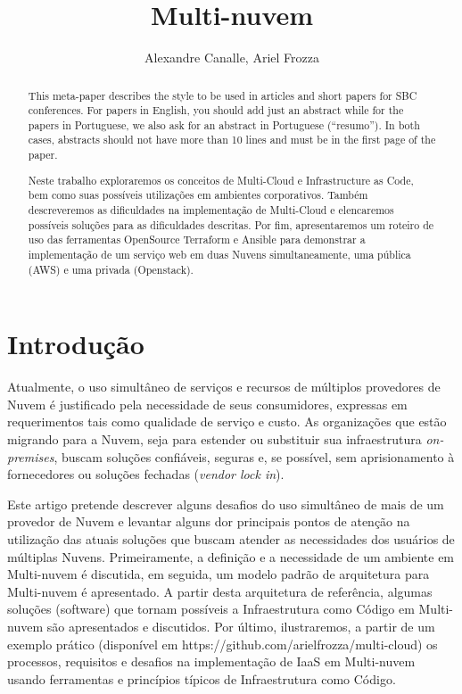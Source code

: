\documentclass[12pt]{article}
\title{Multi-nuvem}
\author{Alexandre Canalle\inst{1}, Ariel Frozza\inst{1}}
\begin{document}
\sloppy
\maketitle
	
\begin{abstract}
	This meta-paper describes the style to be used in articles and short papers
	for SBC conferences. For papers in English, you should add just an abstract
	while for the papers in Portuguese, we also ask for an abstract in
	Portuguese (``resumo''). In both cases, abstracts should not have more than
	10 lines and must be in the first page of the paper.
\end{abstract}

\begin{abstract} 
	Neste trabalho exploraremos os conceitos de Multi-Cloud e Infrastructure as Code, bem como suas possíveis utilizações em ambientes corporativos. Também descreveremos as dificuldades na implementação de Multi-Cloud e elencaremos possíveis soluções para as dificuldades descritas.  Por fim, apresentaremos um roteiro de uso das ferramentas OpenSource Terraform e Ansible para demonstrar a implementação de um serviço web em duas Nuvens simultaneamente, uma pública (AWS) e uma privada (Openstack).
\end{abstract}

	\section{Introdução}
	    Atualmente, o uso simultâneo de serviços e recursos de múltiplos provedores de Nuvem é justificado pela necessidade de seus consumidores, expressas em requerimentos tais como qualidade de serviço e custo. As organizações que estão migrando para a Nuvem, seja para estender ou substituir sua infraestrutura \textit{on-premises}, buscam soluções confiáveis, seguras e, se possível, sem aprisionamento à fornecedores ou soluções fechadas (\textit{vendor lock in}).
	    
	    Este artigo pretende descrever alguns desafios do uso simultâneo de mais de um provedor de Nuvem e levantar alguns dor principais pontos de atenção na utilização das atuais soluções que buscam atender as necessidades dos usuários de múltiplas Nuvens. Primeiramente, a definição e a necessidade de um ambiente em Multi-nuvem é discutida, em seguida, um modelo padrão de arquitetura para Multi-nuvem é apresentado. A partir desta arquitetura de referência, algumas soluções (software) que tornam possíveis a Infraestrutura como Código em Multi-nuvem são apresentados e discutidos. Por último, ilustraremos, a partir de um exemplo prático (disponível em https://github.com/arielfrozza/multi-cloud) os processos, requisitos e desafios na implementação de IaaS em Multi-nuvem usando ferramentas e princípios típicos de Infraestrutura como Código.
	    
\end{document}
